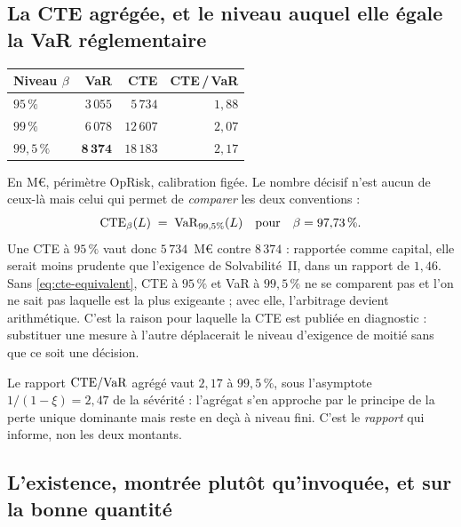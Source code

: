 \subsection*{La CTE agrégée, et le niveau auquel elle égale la VaR réglementaire}

\begin{center}\footnotesize
\renewcommand{\arraystretch}{1.25}
\begin{tabular}{@{}l r r r@{}}
\toprule
\textbf{Niveau $\beta$} & \textbf{VaR} & \textbf{CTE} & \textbf{CTE\,/\,VaR} \\
\midrule
$95\,\%$ & $3\,055$ & $5\,734$ & $1{,}88$ \\
$99\,\%$ & $6\,078$ & $12\,607$ & $2{,}07$ \\
$99{,}5\,\%$ & $\mathbf{8\,374}$ & $18\,183$ & $2{,}17$ \\
\bottomrule
\end{tabular}
\end{center}

\vspace{4pt}
\noindent En M\euro, périmètre OpRisk, calibration figée. Le nombre décisif n'est aucun de ceux-là
mais celui qui permet de \emph{comparer} les deux conventions :
\begin{equation}
  \mathrm{CTE}_\beta(L) \;=\; \mathrm{VaR}_{99{,}5\%}(L) \quad\text{pour}\quad \beta = 97{,}73\,\%.
  \label{eq:cte-equivalent}
\end{equation}
Une CTE à $95\,\%$ vaut donc $5\,734$~M\euro{} contre $8\,374$ : rapportée comme capital, elle
serait moins prudente que l'exigence de Solvabilité~II, dans un rapport de $1{,}46$. Sans
\eqref{eq:cte-equivalent}, \og CTE à $95\,\%$\fg{} et \og VaR à $99{,}5\,\%$\fg{} ne se comparent pas et l'on
ne sait pas laquelle est la plus exigeante ; avec elle, l'arbitrage devient arithmétique. C'est la
raison pour laquelle la CTE est publiée en diagnostic : substituer une mesure à l'autre
déplacerait le niveau d'exigence de moitié sans que ce soit une décision.

Le rapport $\mathrm{CTE}/\mathrm{VaR}$ agrégé vaut $2{,}17$ à $99{,}5\,\%$, sous l'asymptote
$1/(1-\xi) = 2{,}47$ de la sévérité : l'agrégat s'en approche par le principe de la perte unique
dominante mais reste en deçà à niveau fini. C'est le \emph{rapport} qui informe, non les deux
montants.

\subsection*{L'existence, montrée plutôt qu'invoquée, et sur la bonne quantité}

